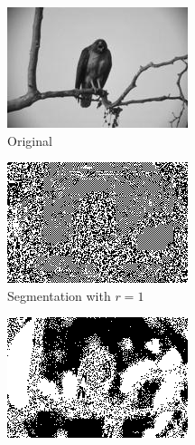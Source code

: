 \documentclass[11pt]{article}
\begin{document}
\begin{figure}
\centering
\graphicspath{{../code/}}
\begin{subfigure}[b]{0.4\textwidth}
\centering
\includegraphics[width=\textwidth]{hawk_sm}
\caption{Original}
\label{rad:orig}
\end{subfigure}
\begin{subfigure}[b]{0.4\textwidth}
\centering
\includegraphics[width=\textwidth]{hawk_1_seg}
\caption{Segmentation with $r=1$}
\label{rad:r1}
\end{subfigure}
\begin{subfigure}[b]{0.4\textwidth}
\centering
\includegraphics[width=\textwidth]{hawk_5_seg}

\end{subfigure}
\end{figure}
\end{document}
